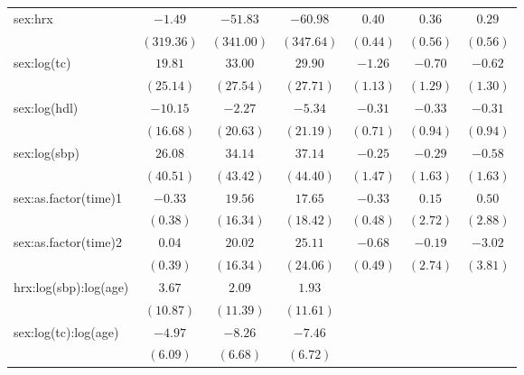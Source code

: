 \begin{tabular}{l c c c c c c}
sex:hrx                           & $-1.49$      & $-51.83$   & $-60.98$   & $0.40$         & $0.36$         & $0.29$         \\
                                  & $(319.36)$   & $(341.00)$ & $(347.64)$ & $(0.44)$       & $(0.56)$       & $(0.56)$       \\
sex:log(tc)                       & $19.81$      & $33.00$    & $29.90$    & $-1.26$        & $-0.70$        & $-0.62$        \\
                                  & $(25.14)$    & $(27.54)$  & $(27.71)$  & $(1.13)$       & $(1.29)$       & $(1.30)$       \\
sex:log(hdl)                      & $-10.15$     & $-2.27$    & $-5.34$    & $-0.31$        & $-0.33$        & $-0.31$        \\
                                  & $(16.68)$    & $(20.63)$  & $(21.19)$  & $(0.71)$       & $(0.94)$       & $(0.94)$       \\
sex:log(sbp)                      & $26.08$      & $34.14$    & $37.14$    & $-0.25$        & $-0.29$        & $-0.58$        \\
                                  & $(40.51)$    & $(43.42)$  & $(44.40)$  & $(1.47)$       & $(1.63)$       & $(1.63)$       \\
sex:as.factor(time)1              & $-0.33$      & $19.56$    & $17.65$    & $-0.33$        & $0.15$         & $0.50$         \\
                                  & $(0.38)$     & $(16.34)$  & $(18.42)$  & $(0.48)$       & $(2.72)$       & $(2.88)$       \\
sex:as.factor(time)2              & $0.04$       & $20.02$    & $25.11$    & $-0.68$        & $-0.19$        & $-3.02$        \\
                                  & $(0.39)$     & $(16.34)$  & $(24.06)$  & $(0.49)$       & $(2.74)$       & $(3.81)$       \\
hrx:log(sbp):log(age)             & $3.67$       & $2.09$     & $1.93$     &                &                &                \\
                                  & $(10.87)$    & $(11.39)$  & $(11.61)$  &                &                &                \\
sex:log(tc):log(age)              & $-4.97$      & $-8.26$    & $-7.46$    &                &                &                \\
                                  & $(6.09)$     & $(6.68)$   & $(6.72)$   &                &                &                \\

\end{tabular}
